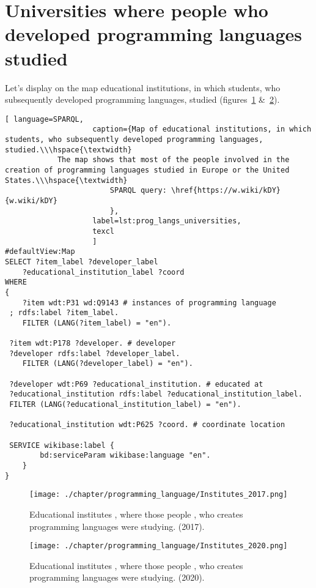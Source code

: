 \section{Universities where people who developed programming languages studied}
Let's display on the map educational institutions, in which students, who subsequently developed programming languages, studied (figures~\ref{fig:institutes_2017} \&~\ref{fig:institutes_2020}).
\newpage
\begin{lstlisting}[ language=SPARQL, 
                    caption={Map of educational institutions, in which students, who subsequently developed programming languages, studied.\\\hspace{\textwidth}
			The map shows that most of the people involved in the creation of programming languages studied in Europe or the United States.\\\hspace{\textwidth}
                        SPARQL query: \href{https://w.wiki/kDY}{w.wiki/kDY}
                        },
                    label=lst:prog_langs_universities,
                    texcl 
                    ]
#defaultView:Map
SELECT ?item_label ?developer_label 
	?educational_institution_label ?coord
WHERE
{
 	?item wdt:P31 wd:Q9143 # instances of programming language
 ; rdfs:label ?item_label. 
 	FILTER (LANG(?item_label) = "en"). 
 
 ?item wdt:P178 ?developer. # developer
 ?developer rdfs:label ?developer_label. 
 	FILTER (LANG(?developer_label) = "en"). 
 		
 ?developer wdt:P69 ?educational_institution. # educated at
 ?educational_institution rdfs:label ?educational_institution_label. 
 FILTER (LANG(?educational_institution_label) = "en").
 
 ?educational_institution wdt:P625 ?coord. # coordinate location

 SERVICE wikibase:label {
		bd:serviceParam wikibase:language "en".
	} 	
}
\end{lstlisting}%

\begin{figure}[h]
\centering
	\texttt{[image: ./chapter/programming\_language/Institutes\_2017.png]}
	\caption{Educational institutes , where those people , who creates programming languages were studying. (2017).}
	\label{fig:institutes_2017}
\end{figure}

\begin{figure}[h]
\centering
	\texttt{[image: ./chapter/programming\_language/Institutes\_2020.png]}
	\caption{Educational institutes , where those people , who creates programming languages were studying. (2020).}
	\label{fig:institutes_2020}
\end{figure}

